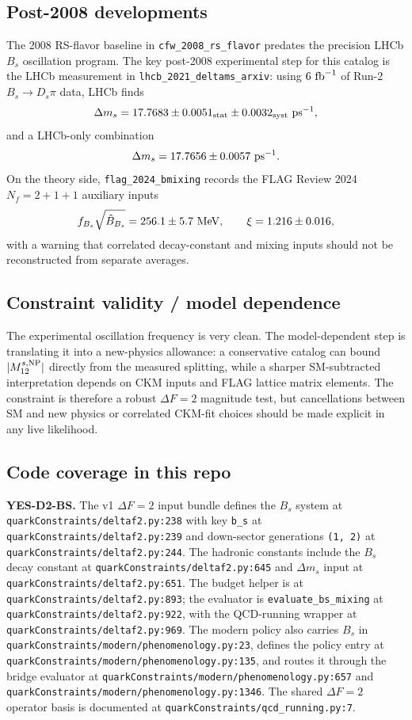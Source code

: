 \subsection*{Post-2008 developments}
The 2008 RS-flavor baseline in \texttt{cfw\_2008\_rs\_flavor} predates the
precision LHCb \(B_s\) oscillation program.  The key post-2008 experimental
step for this catalog is the LHCb measurement in
\texttt{lhcb\_2021\_deltams\_arxiv}: using \(6~{\rm fb}^{-1}\) of Run-2
\(B_s\to D_s\pi\) data, LHCb finds
\[
  \Delta m_s=17.7683\pm0.0051_{\rm stat}\pm0.0032_{\rm syst}~{\rm ps}^{-1},
\]
and a LHCb-only combination
\[
  \Delta m_s=17.7656\pm0.0057~{\rm ps}^{-1}.
\]
On the theory side, \texttt{flag\_2024\_bmixing} records the FLAG Review 2024
\(N_f=2+1+1\) auxiliary inputs
\[
  f_{B_s}\sqrt{\hat B_{B_s}}=256.1\pm5.7~{\rm MeV},\qquad
  \xi=1.216\pm0.016,
\]
with a warning that correlated decay-constant and mixing inputs should not be
reconstructed from separate averages.

\subsection*{Constraint validity / model dependence}
The experimental oscillation frequency is very clean.  The model-dependent step
is translating it into a new-physics allowance: a conservative catalog can bound
\(|M_{12}^{s,{\rm NP}}|\) directly from the measured splitting, while a sharper
SM-subtracted interpretation depends on CKM inputs and FLAG lattice matrix
elements.  The constraint is therefore a robust \(\Delta F=2\) magnitude test,
but cancellations between SM and new physics or correlated CKM-fit choices
should be made explicit in any live likelihood.

\subsection*{Code coverage in this repo}
\textbf{YES-D2-BS.}  The v1 \(\Delta F=2\) input bundle defines the \(B_s\) system at
\texttt{quarkConstraints/deltaf2.py:238} with key \texttt{b\_s} at
\texttt{quarkConstraints/deltaf2.py:239} and down-sector generations
\texttt{(1, 2)} at \texttt{quarkConstraints/deltaf2.py:244}.  The hadronic
constants include the \(B_s\) decay constant at
\texttt{quarkConstraints/deltaf2.py:645} and \(\Delta m_s\) input at
\texttt{quarkConstraints/deltaf2.py:651}.  The budget helper is at
\texttt{quarkConstraints/deltaf2.py:893}; the evaluator is
\texttt{evaluate\_bs\_mixing} at \texttt{quarkConstraints/deltaf2.py:922},
with the QCD-running wrapper at \texttt{quarkConstraints/deltaf2.py:969}.
The modern policy also carries \(B_s\) in
\texttt{quarkConstraints/modern/phenomenology.py:23}, defines the policy entry
at \texttt{quarkConstraints/modern/phenomenology.py:135}, and routes it through
the bridge evaluator at \texttt{quarkConstraints/modern/phenomenology.py:657}
and \texttt{quarkConstraints/modern/phenomenology.py:1346}.  The shared
\(\Delta F=2\) operator basis is documented at
\texttt{quarkConstraints/qcd\_running.py:7}.


